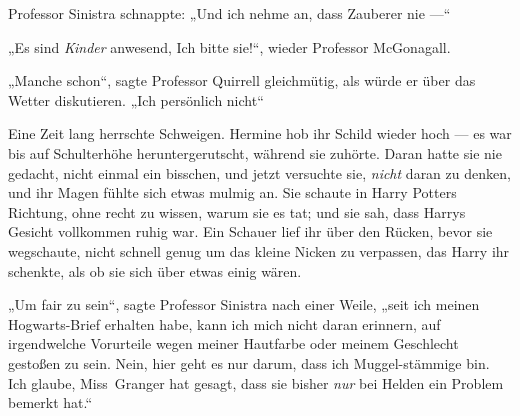 Professor Sinistra schnappte:
„Und ich nehme an, dass Zauberer nie —“

„Es sind \emph{Kinder} anwesend, Ich bitte sie!“, wieder Professor McGonagall.

„Manche schon“, sagte Professor Quirrell gleichmütig, als würde er über das Wetter diskutieren.
„Ich persönlich nicht“

Eine Zeit lang herrschte Schweigen. Hermine hob ihr Schild wieder hoch — es war bis auf Schulterhöhe heruntergerutscht, während sie zuhörte. Daran hatte sie nie gedacht, nicht einmal ein bisschen, und jetzt versuchte sie, \emph{nicht} daran zu denken, und ihr Magen fühlte sich etwas mulmig an. Sie schaute in Harry Potters Richtung, ohne recht zu wissen, warum sie es tat; und sie sah, dass Harrys Gesicht vollkommen ruhig war. Ein Schauer lief ihr über den Rücken, bevor sie wegschaute, nicht schnell genug um das kleine Nicken zu verpassen, das Harry ihr schenkte, als ob sie sich über etwas einig wären.

„Um fair zu sein“, sagte Professor Sinistra nach einer Weile, „seit ich meinen Hogwarts-Brief erhalten habe, kann ich mich nicht daran erinnern, auf irgendwelche Vorurteile wegen meiner Hautfarbe oder meinem Geschlecht gestoßen zu sein. Nein, hier geht es nur darum, dass ich Muggel-stämmige bin. Ich glaube, Miss~Granger hat gesagt, dass sie bisher \emph{nur} bei Helden ein Problem bemerkt hat.“

